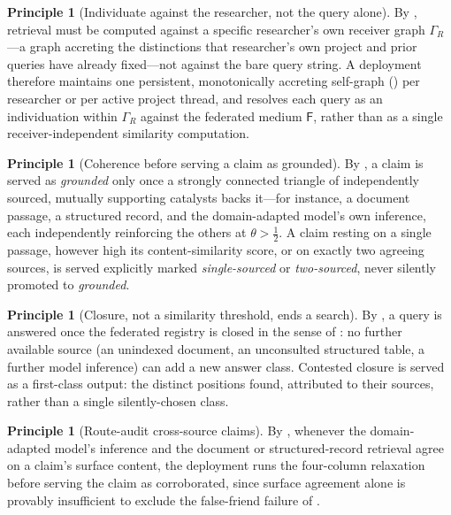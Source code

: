 \documentclass[11pt,twocolumn,a4paper]{article}
\theoremstyle{frathm}
\theoremstyle{definition}
\newtheorem{principle}[theorem]{Principle}
\theoremstyle{remark}
\newcommand{\Gph}{\Gamma}
\newcommand{\Fed}{\mathsf{F}}
\begin{document}
\begin{principle}[Individuate against the researcher, not the query
alone]
\label{prin:receiver}
By , retrieval must be computed against a specific
researcher's own receiver graph $\Gph_R$---a graph accreting the
distinctions that researcher's own project and prior queries have already
fixed---not against the bare query string. A deployment therefore
maintains one persistent, monotonically accreting self-graph
() per researcher or per active project thread, and
resolves each query as an individuation within $\Gph_R$ against the
federated medium $\Fed$, rather than as a single receiver-independent
similarity computation.
\end{principle}

\begin{principle}[Coherence before serving a claim as grounded]
\label{prin:coherence-deploy}
By , a claim is served as \emph{grounded} only once a
strongly connected triangle of independently sourced, mutually supporting
catalysts backs it---for instance, a document passage, a structured
record, and the domain-adapted model's own inference, each independently
reinforcing the others at $\theta>\tfrac12$. A claim resting on a single
passage, however high its content-similarity score, or on exactly two
agreeing sources, is served explicitly marked \emph{single-sourced} or
\emph{two-sourced}, never silently promoted to \emph{grounded}.
\end{principle}

\begin{principle}[Closure, not a similarity threshold, ends a search]
\label{prin:closure-deploy}
By , a query is answered once the
federated registry is closed in the sense of : no
further available source (an unindexed document, an unconsulted
structured table, a further model inference) can add a new answer class.
Contested closure is served as a first-class output: the distinct
positions found, attributed to their sources, rather than a single
silently-chosen class.
\end{principle}

\begin{principle}[Route-audit cross-source claims]
\label{prin:route-audit-deploy}
By , whenever the domain-adapted model's inference
and the document or structured-record retrieval agree on a claim's
surface content, the deployment runs the four-column relaxation before
serving the claim as corroborated, since surface agreement alone is
provably insufficient to exclude the false-friend failure of
.
\end{principle}
\end{document}

